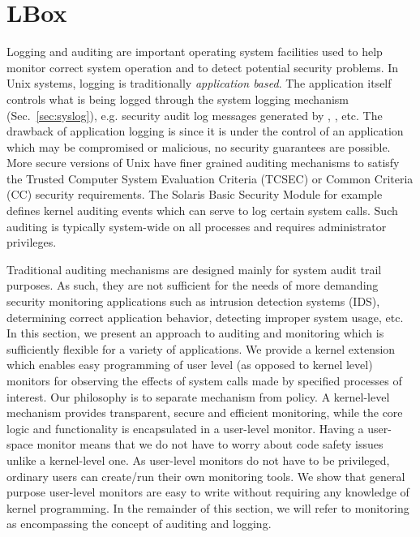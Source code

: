 \clearpage
\section{LBox}
\label{sec:lbox}



Logging and auditing are important operating system facilities used
to help monitor correct system operation and to detect potential
security problems.
In Unix systems, logging is traditionally {\em application based}.
The application itself controls what is being logged through
the system logging mechanism  (Sec.~\ref{sec:syslog}), e.g.
security audit log messages generated 
by , , etc.
The drawback of application logging is since it is under the
control of an application which may be compromised or malicious,
no security guarantees are possible.
More secure versions of Unix have finer grained auditing mechanisms
to satisfy the Trusted Computer System Evaluation Criteria (TCSEC) or Common
Criteria (CC) security requirements.
The Solaris Basic Security Module \cite{solaris-sec-svc}
for example defines kernel auditing events 
which can serve to log certain system calls.
Such auditing is typically system-wide on all processes and
requires administrator privileges.

Traditional auditing mechanisms are designed mainly for
system audit trail purposes.
As such, they are not sufficient for the needs
of more demanding security monitoring applications
such as intrusion detection systems (IDS), 
determining correct application behavior, detecting improper system usage, etc.
In this section, we present an approach to auditing and monitoring
which is sufficiently flexible for a variety of applications.
We provide a kernel extension which enables easy
programming of user level (as opposed to kernel level) monitors for 
observing the effects of system calls made by specified processes of interest.
Our philosophy is to separate mechanism from policy.
A kernel-level mechanism provides transparent, secure and efficient monitoring,
while the core logic and functionality is encapsulated in a user-level monitor.
Having a user-space monitor means that
we do not have to worry about code safety
issues unlike a kernel-level one.
As user-level monitors do not have to be privileged, 
ordinary users can create/run their own monitoring tools.
We show that general purpose user-level monitors are easy to write 
without requiring any knowledge of kernel programming. 
In the remainder of this section, we will refer to monitoring as encompassing
the concept of auditing and logging.

